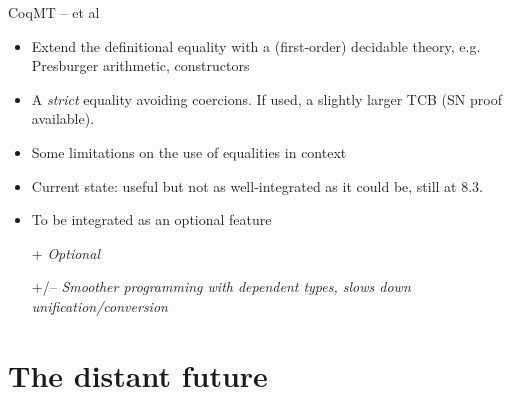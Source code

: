 \begin{subsecframe}{CoqMT --  et al}
  \begin{itemize}
  \item Extend the definitional equality with a (first-order) decidable
    theory, e.g. Presburger arithmetic, constructors
  \item<presentation:only@0>[$"->"$] A \emph{strict} equality avoiding coercions.
    If used, a slightly larger TCB (SN proof available).
  \item Some limitations on the use of equalities in context
  \item Current state: useful but not as well-integrated as it could
    be, still at 8.3.
  \item To be integrated as an optional feature
  \end{itemize}

  \begin{itemize}
  \item[+] \emph{Optional}
  \item[+/--] \emph{Smoother programming with dependent types, slows
      down unification/conversion}
  \end{itemize}

\end{subsecframe}  

\section{The distant future}


